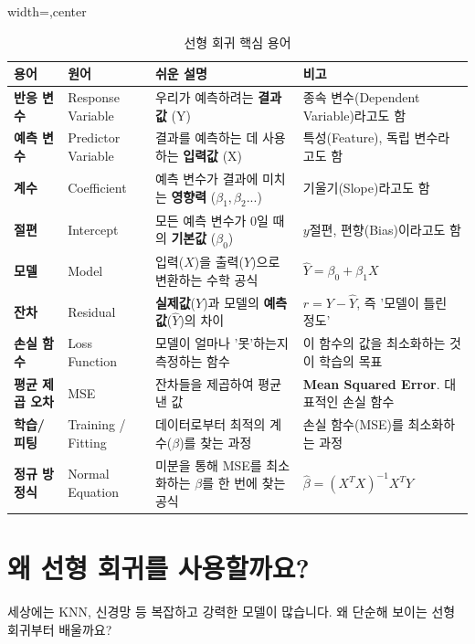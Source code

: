 \documentclass[11pt,a4paper]{book}
\theoremstyle{definition}
\begin{document}
\begin{table}[h!]
\centering
\caption{선형 회귀 핵심 용어}
\label{tab:terminology}
\begin{adjustbox}{width=\textwidth,center}
\begin{tabular}{@{}llll@{}}
\toprule
\textbf{용어} & \textbf{원어} & \textbf{쉬운 설명} & \textbf{비고} \\ \midrule
\textbf{반응 변수} & Response Variable & 우리가 예측하려는 \textbf{결과값} (Y) & 종속 변수(Dependent Variable)라고도 함 \\
\textbf{예측 변수} & Predictor Variable & 결과를 예측하는 데 사용하는 \textbf{입력값} (X) & 특성(Feature), 독립 변수라고도 함 \\
\textbf{계수} & Coefficient & 예측 변수가 결과에 미치는 \textbf{영향력} ($\beta_1, \beta_2...$) & 기울기(Slope)라고도 함 \\
\textbf{절편} & Intercept & 모든 예측 변수가 0일 때의 \textbf{기본값} ($\beta_0$) & $y$절편, 편향(Bias)이라고도 함 \\
\textbf{모델} & Model & 입력($X$)을 출력($Y$)으로 변환하는 수학 공식 & $\hat{Y} = \beta_0 + \beta_1 X$ \\
\textbf{잔차} & Residual & \textbf{실제값}($Y$)과 모델의 \textbf{예측값}($\hat{Y}$)의 차이 & $r = Y - \hat{Y}$, 즉 '모델이 틀린 정도' \\
\textbf{손실 함수} & Loss Function & 모델이 얼마나 '못'하는지 측정하는 함수 & 이 함수의 값을 최소화하는 것이 학습의 목표 \\
\textbf{평균 제곱 오차} & MSE & 잔차들을 제곱하여 평균 낸 값 & \textbf{Mean Squared Error}. 대표적인 손실 함수 \\
\textbf{학습/피팅} & Training / Fitting & 데이터로부터 최적의 계수($\beta$)를 찾는 과정 & 손실 함수(MSE)를 최소화하는 과정 \\
\textbf{정규 방정식} & Normal Equation & 미분을 통해 MSE를 최소화하는 $\beta$를 한 번에 찾는 공식 & $\hat{\beta} = (X^T X)^{-1} X^T Y$ \\ \bottomrule
\end{tabular}
\end{adjustbox}
\end{table}

\section{왜 선형 회귀를 사용할까요?}

세상에는 KNN, 신경망 등 복잡하고 강력한 모델이 많습니다. 왜 단순해 보이는 선형 회귀부터 배울까요?
\end{document}
